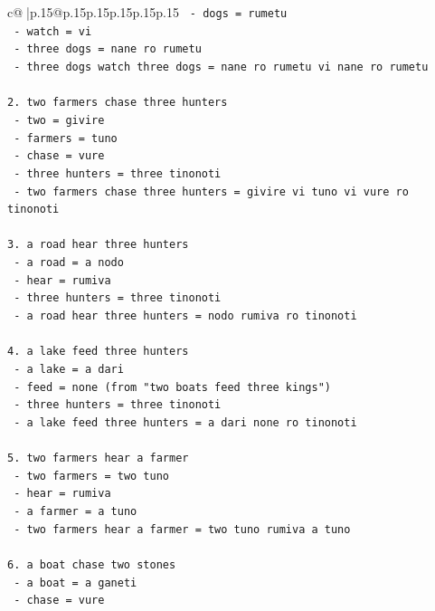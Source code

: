 \documentclass{article}
\begin{document}
{\begin{supertabular}{c@{$\;$}|p{.15\linewidth}@{}p{.15\linewidth}p{.15\linewidth}p{.15\linewidth}p{.15\linewidth}p{.15\linewidth}}
{{{\texttt{   {-} dogs = rumetu} \\
\texttt{   {-} watch = vi} \\
\texttt{   {-} three dogs = nane ro rumetu} \\
\texttt{   {-} three dogs watch three dogs = nane ro rumetu vi nane ro rumetu} \\
\\ 
\texttt{2. two farmers chase three hunters} \\
\texttt{   {-} two = givire} \\
\texttt{   {-} farmers = tuno} \\
\texttt{   {-} chase = vure} \\
\texttt{   {-} three hunters = three tinonoti} \\
\texttt{   {-} two farmers chase three hunters = givire vi tuno vi vure ro tinonoti} \\
\\ 
\texttt{3. a road hear three hunters} \\
\texttt{   {-} a road = a nodo} \\
\texttt{   {-} hear = rumiva} \\
\texttt{   {-} three hunters = three tinonoti} \\
\texttt{   {-} a road hear three hunters = nodo rumiva ro tinonoti} \\
\\ 
\texttt{4. a lake feed three hunters} \\
\texttt{   {-} a lake = a dari} \\
\texttt{   {-} feed = none (from "two boats feed three kings")} \\
\texttt{   {-} three hunters = three tinonoti} \\
\texttt{   {-} a lake feed three hunters = a dari none ro tinonoti} \\
\\ 
\texttt{5. two farmers hear a farmer} \\
\texttt{   {-} two farmers = two tuno} \\
\texttt{   {-} hear = rumiva} \\
\texttt{   {-} a farmer = a tuno} \\
\texttt{   {-} two farmers hear a farmer = two tuno rumiva a tuno} \\
\\ 
\texttt{6. a boat chase two stones} \\
\texttt{   {-} a boat = a ganeti} \\
\texttt{   {-} chase = vure} \\
}}}
\end{supertabular}}
\end{document}
